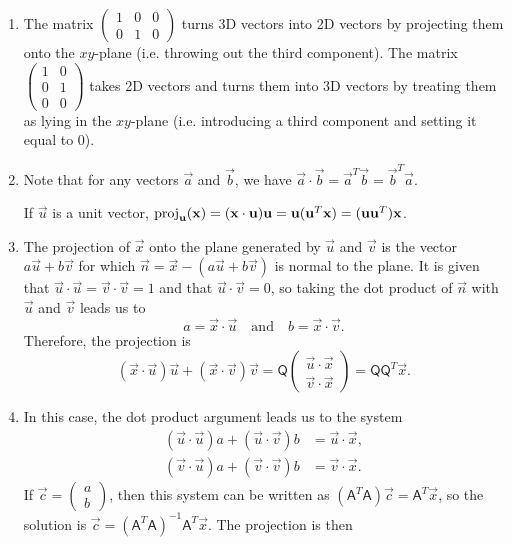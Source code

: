 \begin{enumerate}
\begin{enumerate}
\item The matrix $\begin{pmatrix} 1 & 0 & 0 \\ 0 & 1 & 0 \end{pmatrix}$ turns 3D vectors into 2D vectors by projecting them onto the $xy$-plane (i.e. throwing out the third component). The matrix $\begin{pmatrix} 1 & 0 \\ 0 & 1 \\ 0 & 0 \end{pmatrix}$ takes 2D vectors and turns them into 3D vectors by treating them as lying in the $xy$-plane (i.e. introducing a third component and setting it equal to 0).
\item Note that for any vectors $\vec{a}$ and $\vec{b}$, we have $\vec{a}\cdot\vec{b} = \vec{a}^T\vec{b} = \vec{b}^T\vec{a}$.\par
If $\vec{u}$ is a unit vector, $\operatorname{proj}_{\mathbf{u}}(\mathbf{x}) = (\mathbf{x}\cdot\mathbf{u})\mathbf{u} = \mathbf{u}(\mathbf{u}^T\mathbf{x}) = (\mathbf{uu}^T)\mathbf{x}$.
\item The projection of $\vec{x}$ onto the plane generated by $\vec{u}$ and $\vec{v}$ is the vector $a\vec{u} + b\vec{v}$ for which $\vec{n} = \vec{x} - (a\vec{u} + b\vec{v})$ is normal to the plane. It is given that $\vec{u}\cdot\vec{u} = \vec{v}\cdot\vec{v} = 1$ and that $\vec{u}\cdot\vec{v} = 0$, so taking the dot product of $\vec{n}$ with $\vec{u}$ and $\vec{v}$ leads us to
\begin{equation*}
a = \vec{x}\cdot\vec{u}\quad\text{and}\quad b = \vec{x}\cdot\vec{v}.
\end{equation*}
Therefore, the projection is
\begin{equation*}
(\vec{x}\cdot\vec{u})\vec{u} + (\vec{x}\cdot\vec{v})\vec{v} = \mathsf{Q}\begin{pmatrix} \vec{u}\cdot\vec{x} \\ \vec{v}\cdot\vec{x} \end{pmatrix} = \mathsf{QQ}^T\vec{x}.
\end{equation*}
\item In this case, the dot product argument leads us to the system
\begin{align*}
(\vec{u}\cdot\vec{u})a + (\vec{u}\cdot\vec{v})b &= \vec{u}\cdot\vec{x}, \\
(\vec{v}\cdot\vec{u})a + (\vec{v}\cdot\vec{v})b &= \vec{v}\cdot\vec{x}.
\end{align*}
If $\vec{c} = \begin{pmatrix} a \\ b \end{pmatrix}$, then this system can be written as $(\mathsf{A}^T\mathsf{A})\vec{c} = \mathsf{A}^T\vec{x}$, so the solution is $\vec{c} = (\mathsf{A}^T\mathsf{A})^{-1}\mathsf{A}^T\vec{x}$. The projection is then

\end{enumerate}
\end{enumerate}
